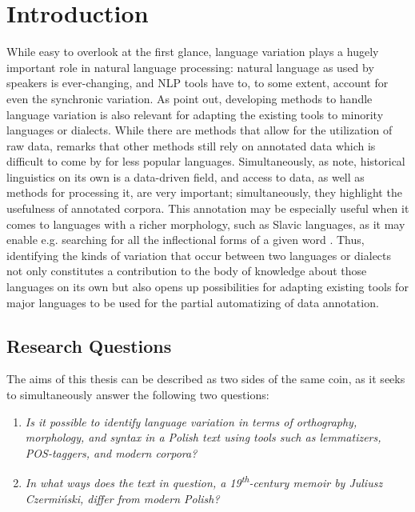 \section{Introduction}
\label{sec:intro}

While easy to overlook at the first glance, language variation plays a hugely important role in natural language processing: natural language as used by speakers is ever-changing, and NLP tools have to, to some extent, account for even the synchronic variation. As \citet{Zampieri2020NaturalLP} point out, developing methods to handle language variation is also relevant for adapting the existing tools to minority languages or dialects. While there are methods that allow for the utilization of raw data, \citet{ponti_2019} remarks that other methods still rely on annotated data which is difficult to come by for less popular languages. Simultaneously, as \citet{quantitative-historical} note, historical linguistics on its own is a data-driven field, and access to data, as well as methods for processing it, are very important; simultaneously, they highlight the usefulness of annotated corpora. This annotation may be especially useful when it comes to languages with a richer morphology, such as Slavic languages, as it may enable e.g. searching for all the inflectional forms of a given word \citep{pęzik_2012}. Thus, identifying the kinds of variation that occur between two languages or dialects not only constitutes a contribution to the body of knowledge about those languages on its own but also opens up possibilities for adapting existing tools for major languages to be used for the partial automatizing of data annotation. 

\subsection{Research Questions}
\label{subsec:research-questions}

The aims of this thesis can be described as two sides of the same coin, as it seeks to simultaneously answer the following two questions:
\begin{enumerate}
    \item \textit{Is it possible to identify language variation in terms of orthography, morphology, and syntax in a Polish text using tools such as lemmatizers, POS-taggers, and modern corpora?}
    \item \textit{In what ways does the text in question, a 19\textsuperscript{th}-century memoir by Juliusz Czermiński, differ from modern Polish?}
\end{enumerate}

